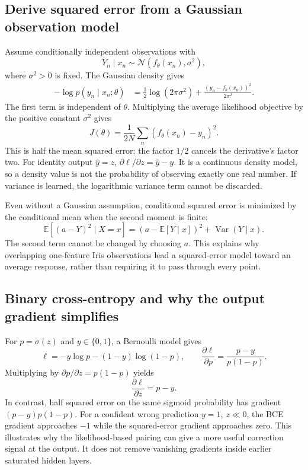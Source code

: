 \subsection{Derive squared error from a Gaussian observation model}
Assume conditionally independent observations with
\[
 Y_n\mid x_n\sim\mathcal{N}(f_\theta(x_n),\sigma^2),
\]
where $\sigma^2>0$ is fixed. The Gaussian density gives
\begin{align}
 -\log p(y_n\mid x_n;\theta)
 &=\tfrac12\log(2\pi\sigma^2)+\frac{(y_n-f_\theta(x_n))^2}{2\sigma^2}.
\end{align}
The first term is independent of $\theta$. Multiplying the average likelihood objective by the positive constant $\sigma^2$ gives
\[
 \boxed{J(\theta)=\frac1{2N}\sum_n(f_\theta(x_n)-y_n)^2.}
\]
This is half the mean squared error; the factor $1/2$ cancels the derivative's factor two. For identity output $\hat y=z$, $\partial\ell/\partial z=\hat y-y$. It is a continuous density model, so a density value is not the probability of observing exactly one real number. If variance is learned, the logarithmic variance term cannot be discarded.

Even without a Gaussian assumption, conditional squared error is minimized by the conditional mean when the second moment is finite:
\[
 \mathbb E[(a-Y)^2\mid X=x]
 =(a-\mathbb E[Y\mid x])^2+\operatorname{Var}(Y\mid x).
\]
The second term cannot be changed by choosing $a$. This explains why overlapping one-feature Iris observations lead a squared-error model toward an average response, rather than requiring it to pass through every point.

\subsection{Binary cross-entropy and why the output gradient simplifies}
For $p=\sigma(z)$ and $y\in\{0,1\}$, a Bernoulli model gives
\[
 \ell=-y\log p-(1-y)\log(1-p),\qquad
 \frac{\partial\ell}{\partial p}=\frac{p-y}{p(1-p)}.
\]
Multiplying by $\partial p/\partial z=p(1-p)$ yields
\[
 \boxed{\frac{\partial\ell}{\partial z}=p-y.}
\]
In contrast, half squared error on the same sigmoid probability has gradient
$(p-y)p(1-p)$. For a confident wrong prediction $y=1$, $z\ll0$, the BCE gradient approaches $-1$ while the squared-error gradient approaches zero. This illustrates why the likelihood-based pairing can give a more useful correction signal at the output. It does not remove vanishing gradients inside earlier saturated hidden layers.

